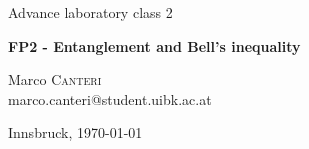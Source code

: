 \documentclass[a4paper,10pt]{article}
\begin{document}
\begin{titlepage}
 \begin{center}
	\Large{Advance laboratory class 2}
	\end{center}
	\begin{center}
	 \LARGE{\textbf{FP2 - Entanglement and Bell’s inequality}}
	\end{center}
	
	\begin{center}
	
	\large Marco \textsc{Canteri} \\
	marco.canteri@student.uibk.ac.at
	\end{center}
	
	\begin{center}
	\vspace{1cm}
	Innsbruck, \today
	\vspace{2cm}
	\end{center}
	

\end{titlepage}
\end{document}
